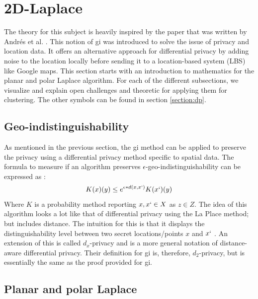 
\section{2D-Laplace}
The theory for this subject is heavily inspired by the paper that was written by Andrés et al. \citep{DBLP:journals/corr/abs-1212-1984}.
This notion of \gls{gi} was introduced to solve the issue of privacy and location data.
It offers an alternative approach for differential privacy by adding noise to the location locally before sending it to a location-based system (LBS) like Google maps.
This section starts with an introduction to mathematics for the planar and polar Laplace algorithm.
For each of the different subsections, we visualize and explain open challenges and theoretic for applying them for clustering.
\glsaddall
\leading{10pt}
\printglossary[type=genericmath, nonumberlist]
The other symbols can be found in section \ref{section:dp}.
\subsection*{Geo-indistinguishability}
As mentioned in the previous section, the \gls{gi} method can be applied to preserve the privacy using a differential privacy method specific to spatial data.
The formula to measure if an algorithm preserves $\epsilon$-geo-indistinguishability can be expressed as \citep{DBLP:journals/corr/abs-1212-1984}:
\begin{equation}
  K(x)(y) \le e^{\epsilon * d(x,x`)} K(x`)(y)
  \label{algo:2d-geo-indistinguishability}
\end{equation}
Where $K$ is a probability method reporting $x, x` \in X$ as $z \in Z$.
The idea of this algorithm looks a lot like that of differential privacy using the La Place method; but includes distance.
The intuition for this is that it displays the distinguishability level between two secret locations/points $x$ and $x`$ \citep{chatzikokolakis_constructing_2015}.
An extension of this is called $d_x$-privacy and is a more general notation of distance-aware differential privacy.
Their definition for \gls{gi} is, therefore, $d_2$-privacy, but is essentially the same as the proof provided for \gls{gi}.

\subsection{Planar and polar Laplace}
\printglossary[type=2dlaplace]

